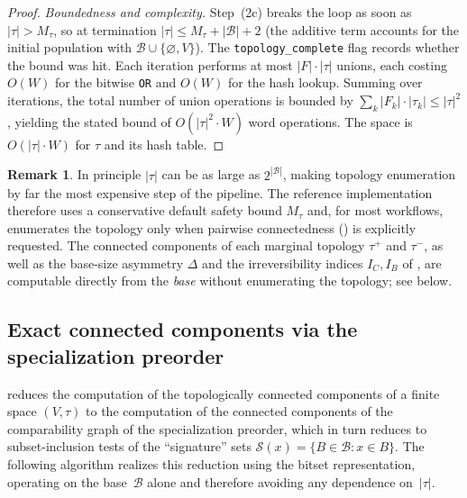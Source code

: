 \documentclass[11pt,a4paper]{article}
\theoremstyle{plain}
\theoremstyle{definition}
\newtheorem{remark}[theorem]{Remark}
\newcommand{\taufwd}{\tau^{+}}
\newcommand{\taubwd}{\tau^{-}}
\newcommand{\base}{\mathcal{B}}
\begin{document}
\begin{proof}
\emph{Boundedness and complexity.}  Step~(2c) breaks the loop as soon
as $|\tau| > M_{\tau}$, so at termination $|\tau| \leq M_{\tau} +
|\base| + 2$ (the additive term accounts for the initial population
with $\base \cup \{\varnothing, V\}$).  The
\texttt{topology\_complete} flag records whether the bound was hit.
Each iteration performs at most $|F| \cdot |\tau|$ unions, each
costing $O(W)$ for the bitwise \texttt{OR} and $O(W)$ for the hash
lookup.  Summing over iterations, the total number of union
operations is bounded by $\sum_{k} |F_{k}| \cdot |\tau_{k}| \leq
|\tau|^{2}$, yielding the stated bound of $O(|\tau|^{2} \cdot W)$
word operations.  The space is $O(|\tau| \cdot W)$ for $\tau$ and its
hash table.
\end{proof}

\begin{remark}
In principle $|\tau|$ can be as large as $2^{|\base|}$, making topology
enumeration by far the most expensive step of the pipeline.  The reference
implementation therefore uses a conservative default safety bound
$M_{\tau}$ and, for most workflows, enumerates the topology only when
pairwise connectedness () is explicitly
requested.  The connected components of each marginal topology
$\taufwd$ and $\taubwd$, as well as the base-size asymmetry $\Delta$ and the
irreversibility indices $I_C, I_B$ of ,
are computable directly from the \emph{base} without enumerating the
topology; see  below.
\end{remark}


\subsection{Exact connected components via the specialization preorder}%
\label{subsec:specialization-algorithm}

 reduces the computation of the
topologically connected components of a finite space $(V, \tau)$ to the
computation of the connected components of the comparability graph of the
specialization preorder, which in turn reduces to subset-inclusion tests of
the ``signature'' sets $\mathcal{S}(x) = \{B \in \base : x \in B\}$.  The
following algorithm realizes this reduction using the bitset representation,
operating on the base~$\base$ alone and therefore avoiding any dependence
on~$|\tau|$.
\end{document}

